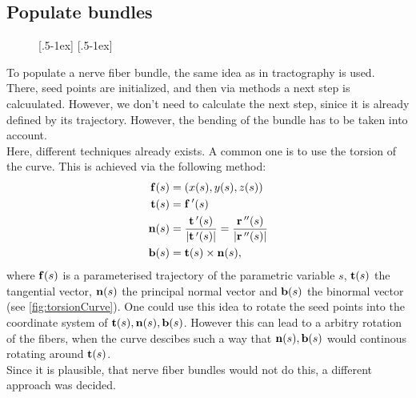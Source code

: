 \subsection{Populate bundles}\label{sec:fillBundle}
% 
\begin{figure}[!t]
    \centering
    [.5\textwidth-1ex]{
    \def\tikzwidth{0.5\textwidth-1ex}
    }\hfill
    [.5\textwidth-1ex]{
    }
	\caption{}
\end{figure}
% 
To populate a nerve fiber bundle, the same idea as in tractography is used.
There, seed points are initialized, and then via \dummy methods a next step is calcuulated.
However, we don't need to calculate the next step, sinice it is already defined by its trajectory.
However, the bending of the bundle has to be taken into account.\\
% 
Here, different techniques already exists.
A common one is to use the torsion of the curve. This is achieved via the following method:
% 
\begin{align}
\begin{split}
\mathbf{f}(s) &= (x(s),y(s),z(s)) \\
\mathbf{t}(s) &= \mathbf{f}\,'(s) \\
\mathbf{n}(s) &= \frac{\mathbf{t}\,'(s)}{|\mathbf{t}\,'(s)|} = \frac{\mathbf{r}\,''(s)}{|\mathbf{r}\,''(s)|} \\
\mathbf{b}(s) &= \mathbf{t}(s) \times \mathbf{n}(s),
\end{split}
\end{align}
% 
where $\mathbf{f}(s)$ is a parameterised trajectory of the parametric variable $s$, $\mathbf{t}(s)$ the tangential vector, $\mathbf{n}(s)$ the principal normal vector and $\mathbf{b}(s)$ the binormal vector (see \cref{fig:torsionCurve}).
One could use this idea to rotate the seed points into the coordinate system of $\mathbf{t}(s),\mathbf{n}(s),\mathbf{b}(s)$.
However this can lead to a arbitry rotation of the fibers, \eg when the curve descibes such a way that $\mathbf{n}(s),\mathbf{b}(s)$ would continous rotating around $\mathbf{t}(s)$.
\\
% 
Since it is plausible, that nerve fiber bundles would not do this, a different approach was decided.
